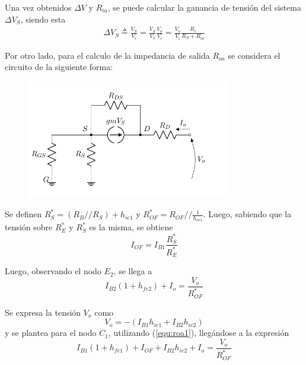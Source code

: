 Una vez obtenidos $\Delta V$ y $R_{ia}$, se puede calcular la ganancia de tensión del sistema $\Delta V_S$, siendo esta
\begin{equation}
\begin{split}
	\Delta V_S \triangleq \frac{V_S}{V_i} = \frac{V_S}{V_o} \frac{V_o}{V_i} = \frac{V_o}{V_i} \frac{R_i}{R_S + R_{ia}}
\end{split}
\label{equ:Avs}
\end{equation}

Por otro lado, para el calculo de la impedancia de salida $R_{oa}$ se considera el circuito de la siguiente forma:
\begin{figure}[H]
\centering
	\includegraphics[width=0.8\textwidth, page=7]{Imagenes/ModeloIncremental.pdf}
\end{figure}
Se definen $R_{S}^* = \left( R_B // R_S \right) + h_{ie1}$ y $R_{OF}^* = R_{OF} // \frac{1}{h_{oe1}}$. Luego, sabiendo que la tensión sobre $R_{E}^*$ y $R_{S}^*$ es la misma, se obtiene
\begin{equation}
	I_{OF} = I_{B1} \frac{R_{S}^*}{R_{E}^*}
	\label{equ:roa1}
\end{equation}

Luego, observando el nodo $E_2$, se llega a
\begin{equation}
	I_{B2} \left( 1 + h_{fe2} \right) + I_o = \frac{V_o}{R_{OF}^*}
	\label{equ:roa2}
\end{equation}

Se expresa la tensión $V_o$ como
\begin{equation}
	V_o = - \left( I_{B1} h_{ie1} + I_{B2} h_{ie2} \right)
	\label{equ:roa3}
\end{equation}
y se plantea para el nodo $C_1$, utilizando (\ref{equ:roa1}), llegándose a la expresión
\begin{equation}
	I_{B1} \left( 1 + h_{fe1} \right) + I_{OF} + I_{B2} h_{ie2} + I_o = \frac{V_o}{R_{OF}^*}
	\label{equ:roa4}
\end{equation}

